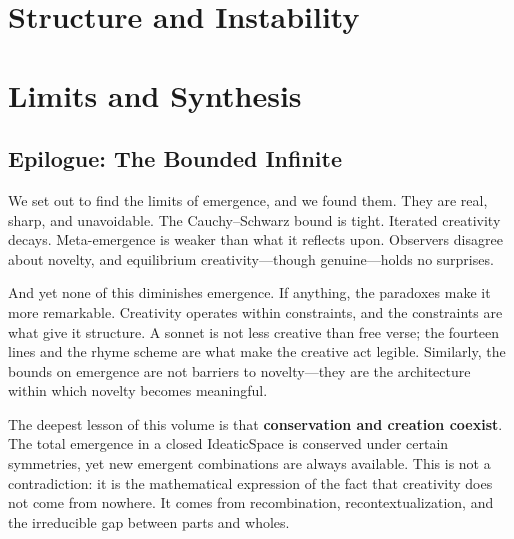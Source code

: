 \documentclass[11pt,oneside]{book}
\theoremstyle{definition}
\theoremstyle{plain}
\theoremstyle{remark}
\begin{document}


\part{Structure and Instability}



\part{Limits and Synthesis}



\backmatter

\chapter*{Epilogue: The Bounded Infinite}

We set out to find the limits of emergence, and we found them. They are real,
sharp, and unavoidable. The Cauchy--Schwarz bound is tight. Iterated creativity
decays. Meta-emergence is weaker than what it reflects upon. Observers
disagree about novelty, and equilibrium creativity---though genuine---holds
no surprises.

And yet none of this diminishes emergence. If anything, the paradoxes make
it more remarkable. Creativity operates within constraints, and the constraints
are what give it structure. A sonnet is not less creative than free verse; the
fourteen lines and the rhyme scheme are what make the creative act legible.
Similarly, the bounds on emergence are not barriers to novelty---they are
the architecture within which novelty becomes meaningful.

The deepest lesson of this volume is that \textbf{conservation and creation
coexist}. The total emergence in a closed IdeaticSpace is conserved under
certain symmetries, yet new emergent combinations are always available. This
is not a contradiction: it is the mathematical expression of the fact that
creativity does not come from nowhere. It comes from recombination,
recontextualization, and the irreducible gap between parts and wholes.
\end{document}
